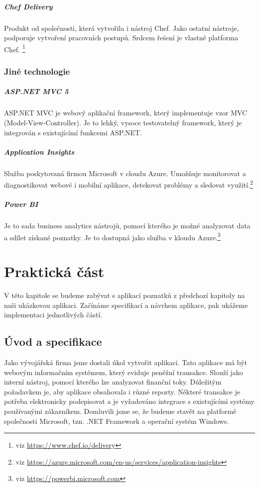 \paragraph{Chef Delivery}
Produkt od společnosti, která vytvořila i nástroj Chef. Jako ostatní nástroje, podporuje vytvoření pracovních postupů. Srdcem řešení je vlastně platforma Chef. \footnote{viz \url{https://www.chef.io/delivery}}

\subsection{Jiné technologie}
\paragraph{ASP.NET MVC 5}
ASP.NET MVC je webový aplikační framework, který implementuje vzor MVC (Model-View-Controller). Je to lehký, vysoce testovatelný framework, který je integrován s existujícímí funkcemi ASP.NET. \cite{aspnetmvc}

\paragraph{Application Insights}
Služba poskytovaná firmou Microsoft v cloudu Azure. Umožňuje monitorovat a diagnostikovat webové i mobilní aplikace, detekovat problémy a sledovat využití.\footnote{viz \url{https://azure.microsoft.com/en-us/services/application-insights}}

\paragraph{Power BI}
Je to sada business analytics nástrojů, pomocí kterého je možné analyzovat data a sdílet získané poznatky. Je to dostupná jako služba v kloudu Azure.\footnote{viz \url{https://powerbi.microsoft.com}}

\chapter{Praktická část}
\label{ch:impl}
V této kapitole se budeme zabývat s aplikací poznatků z předchozí kapitoly na naši ukázkovou aplikaci. Začínáme specifikací a návrhem aplikace, pak ukážeme implementaci jednotlivých částí.

\section{Úvod a specifikace}
Jako vývojářská firma jsme dostali úkol vytvořit aplikaci. Tato aplikace má být webovým informačním systémem, který eviduje peněžní transakce. Slouží jako interní nástroj, pomocí kterého lze analyzovat finanční toky. Důležitým požadavkem je, aby aplikace obsahovala i různé reporty. Některé transakce je potřeba elektronicky podepisovat a je vyžadováno integrace s existujícími systémy používanými zákazníkem. Domluvili jsme se, že budeme stavět na platformě společnosti Microsoft, tzn. .NET Framework a operační systém Windows.

